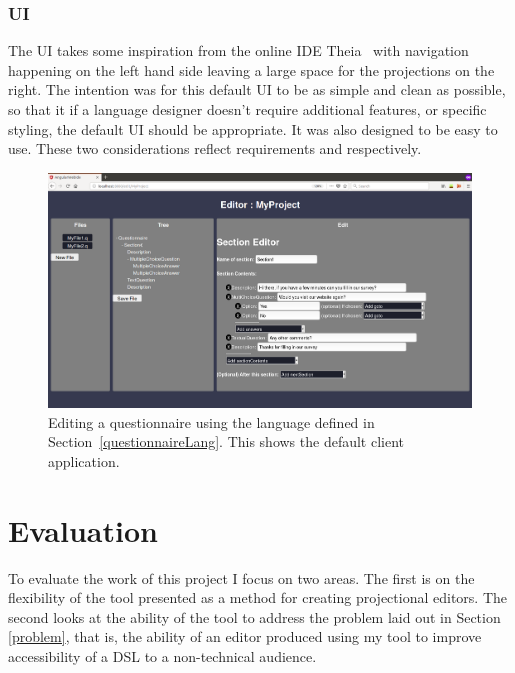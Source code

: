 \documentclass{article}
\begin{document}
{\subsubsection{UI}
The UI takes some inspiration from the online IDE Theia~\cite{theia} with navigation happening on the left hand side leaving a large space for the projections on the right. The intention was for this default UI to be as simple and clean as possible, so that it if a language designer doesn't require additional features, or specific styling, the default UI should be appropriate. It was also designed to be easy to use. These two considerations reflect requirements \RSetup and \RIntuitive respectively.
\begin{figure}[h!]
  \centering
  \includegraphics[width=\linewidth]{./Screenshots/questionnaireUI3.png}
  \caption{Editing a questionnaire using the language defined in Section~\ref{questionnaireLang}. This shows the default client application.}
  \label{fig:webUI}
\end{figure}
%
%
\section{Evaluation}\label{evaluation}
To evaluate the work of this project I focus on two areas. The first is on the flexibility of the tool presented as a method for creating projectional editors. The second looks at the ability of the tool to address the problem laid out in Section \ref{problem}, that is, the ability of an editor produced using my tool to improve accessibility of a DSL to a non-technical audience.
}
\end{document}
